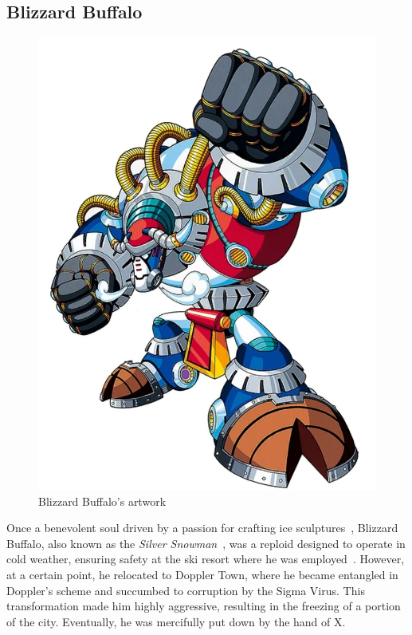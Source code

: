 \subsection{Blizzard Buffalo}\label{boss:Blizzard_buffalo}
\begin{figure}[htp]
	\centering
	\includegraphics[height=\portraitsize]{figures/X3/Blizzard_buffalo/blizzardbuffalo.png}
	\caption{Blizzard Buffalo's artwork~\cite{book:MMX_Complete_art}}
\end{figure}

Once a benevolent soul driven by a passion for crafting ice sculptures~\cite{Xcoll1:Manual_X3}, Blizzard Buffalo, also known as the \textit{Silver Snowman}~\cite{book:MMX_Complete_art}, was a reploid designed to operate in cold weather, ensuring safety at the ski resort where he was employed~\cite{wayback:X3_resources,wiki:Blizzard_buffalo}. However, at a certain point, he relocated to Doppler Town, where he became entangled in Doppler's scheme and succumbed to corruption by the Sigma Virus. This transformation made him highly aggressive, resulting in the freezing of a portion of the city. Eventually, he was mercifully put down by the hand of X.


